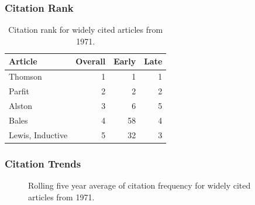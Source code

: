 \documentclass[
  10pt,
  letterpaper,
  DIV=11,
  numbers=noendperiod,
  twoside]{scrartcl}
\begin{document}
\subsubsection*{Citation Rank}\label{sec-rank-1971}

\begin{longtable}[]{@{}lrrr@{}}

\caption{\label{tbl-citation-rank-1971}Citation rank for widely cited
articles from 1971.}

\tabularnewline

\toprule\noalign{}
Article & Overall & Early & Late \\
\midrule\noalign{}
\endhead
\bottomrule\noalign{}
\endlastfoot
Thomson & 1 & 1 & 1 \\
Parfit & 2 & 2 & 2 \\
Alston & 3 & 6 & 5 \\
Bales & 4 & 58 & 4 \\
Lewis, Inductive & 5 & 32 & 3 \\

\end{longtable}

\subsubsection*{Citation Trends}\label{sec-trends-1971}

\begin{figure}


\caption{\label{fig-citation-spaghetti-1971}Rolling five year average of
citation frequency for widely cited articles from 1971.}

\end{figure}%
\end{document}
